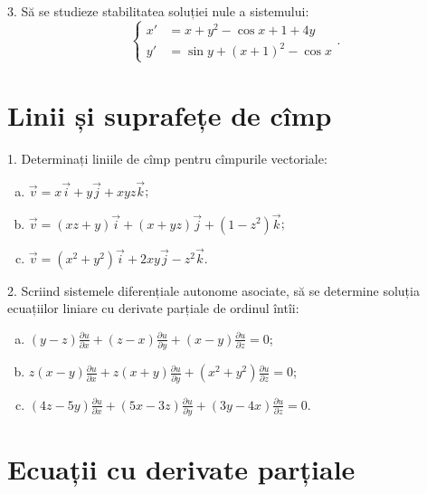 \documentclass[11pt,a4paper]{article}
\theoremstyle{dotless}
\theoremstyle{dotlessdr}
\begin{document}
\vspace{1cm}

3. Să se studieze stabilitatea soluției nule a sistemului:
\[
  \begin{cases}
    x' &= x + y^2 - \cos x + 1 + 4y \\
    y' &= \sin y + (x + 1)^2 - \cos x
  \end{cases}.
\]



\section*{Linii și suprafețe de cîmp}

1. Determinați liniile de cîmp pentru cîmpurile vectoriale:
\begin{enumerate}[(a)]
\item $ \vec{v} = x\vec{i} + y\vec{j} + xyz \vec{k} $;
\item $ \vec{v} = (xz + y)\vec{i} + (x + yz) \vec{j} + (1 - z^2)\vec{k} $;
\item $ \vec{v} = (x^2 + y^2)\vec{i} + 2xy\vec{j} - z^2 \vec{k} $.
\end{enumerate}

\vspace{1cm}

2. Scriind sistemele diferențiale autonome asociate, să se determine
soluția ecuațiilor liniare cu derivate parțiale de ordinul întîi:
\begin{enumerate}[(a)]
\item $ (y - z) \frac{\partial u}{\partial x} + (z - x)\frac{\partial u}{\partial y} + %
  (x - y) \frac{\partial u}{\partial z} = 0 $;
\item $ z(x - y) \frac{\partial u}{\partial x} + z(x + y) \frac{\partial u}{\partial y} + %
  (x^2 + y^2) \frac{\partial u}{\partial z} = 0 $;
\item $ (4z - 5y) \frac{\partial u}{\partial x} + (5x - 3z) \frac{\partial u}{\partial y} + %
  (3y - 4x)\frac{\partial u}{\partial z} = 0 $.
\end{enumerate}


\section*{Ecuații cu derivate parțiale}
\end{document}
